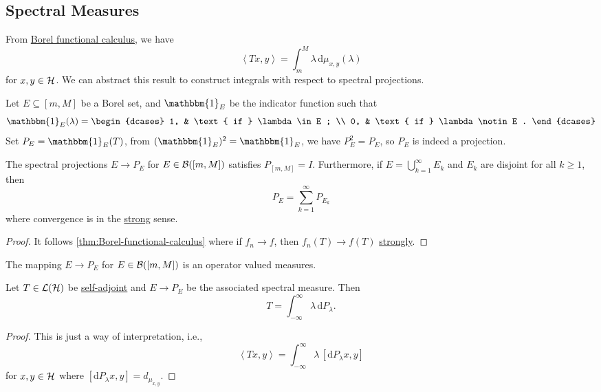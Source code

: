\subsection{Spectral Measures}
From \hyperref[thm:Borel-functional-calculus]{Borel functional calculus}, we have
\[
	\left\langle Tx, y \right\rangle = \int_{m}^{M} \lambda  \,\mathrm{d}\mu _{x, y}(\lambda )
\]
for \(x, y\in \mathcal{\MakeUppercase{h}} \). We can abstract this result to construct integrals with respect to spectral projections.

Let \(E \subseteq [m, M]\) be a Borel set, and \(\mathbbm{1}_{E} \) be the indicator function such that
\[
	\mathbbm{1}_{E} (\lambda ) = \begin{dcases}
		1, & \text{ if } \lambda \in E ;    \\
		0, & \text{ if } \lambda \notin E .
	\end{dcases}
\]
Set \(P_E = \mathbbm{1}_{E}(T) \), from \((\mathbbm{1}_{E} )^2 = \mathbbm{1}_{E} \), we have \(P_E^2 = P_E\), so \(P_E\) is indeed a projection.

\begin{proposition}
	The spectral projections \(E \to P_E\) for \(E\in \mathcal{\MakeUppercase{b}} ([m, M])\) satisfies \(P_{[m, M]} = I\). Furthermore, if \(E = \bigcup_{k=1}^{\infty} E_k\) and \(E_k\) are disjoint for all \(k\geq 1\), then
	\[
		P_E = \sum_{k=1}^{\infty} P_{E_k}
	\]
	where convergence is in the \hyperref[def:strongly-convergence]{strong} sense.
\end{proposition}
\begin{proof}
	It follows \autoref{thm:Borel-functional-calculus} where if \(f_n \to f\), then \(f_n(T) \to f(T)\) \hyperref[def:strongly-convergence]{strongly}.
\end{proof}

\begin{remark}
	The mapping \(E \to P_E\) for \(E\in \mathcal{\MakeUppercase{b}} ([m, M])\) is an operator valued measures.
\end{remark}

\begin{theorem}\label{thm:spectral}
	Let \(T\in \mathcal{\MakeUppercase{l}} (\mathcal{\MakeUppercase{h}} )\) be \hyperref[def:self-adjoint-op]{self-adjoint} and \(E \to P_E\) be the associated spectral measure. Then
	\[
		T = \int_{-\infty}^{\infty} \lambda  \,\mathrm{d}P_\lambda.
	\]
\end{theorem}
\begin{proof}
	This is just a way of interpretation, i.e.,
	\[
		\left\langle Tx, y \right\rangle = \int_{-\infty}^{\infty} \lambda \, \left[\mathrm{d} P_\lambda x, y \right]
	\]
	for \(x, y\in \mathcal{\MakeUppercase{h}} \) where \(\left[ \mathrm{d} P_\lambda x, y \right] = d_{\mu _{x, y}}\).
\end{proof}

